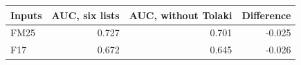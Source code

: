 \begin{tabular}{lrrr}
\toprule
Inputs & AUC, six lists & AUC, without Tolaki & Difference \\
\midrule
FM25 & 0.727 & 0.701 & -0.025 \\
F17 & 0.672 & 0.645 & -0.026 \\
\bottomrule
\end{tabular}

